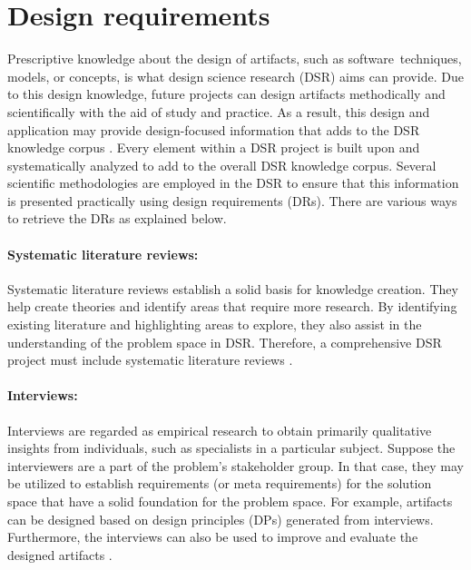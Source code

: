 \section{Design requirements}
\label{background:section:designReqs}
Prescriptive knowledge about the design of artifacts, such as software techniques, models, or concepts, is what design science research (DSR) aims can provide. 
Due to this design knowledge, future projects can design artifacts methodically and scientifically with the aid of study and practice. 
As a result, this design and application may provide design-focused information that adds to the DSR knowledge corpus \cite{misc:dsr:henver}.
Every element within a DSR project is built upon and systematically analyzed to add to the overall DSR knowledge corpus.
Several scientific methodologies are employed in the DSR to ensure that this information is presented practically using design requirements (DRs).
There are various ways to retrieve the DRs as explained below.

\paragraph*{Systematic literature reviews:} 
Systematic literature reviews establish a solid basis for knowledge creation. 
They help create theories and identify areas that require more research.
By identifying existing literature and highlighting areas to explore, they also assist in the understanding of the problem space in DSR.
Therefore, a comprehensive DSR project must include systematic literature reviews \cite{misc:dsr:webster}.

\paragraph*{Interviews:}
Interviews are regarded as empirical research to obtain primarily qualitative insights from individuals, such as specialists in a particular subject. 
Suppose the interviewers are a part of the problem's stakeholder group.
In that case, they may be utilized to establish requirements (or meta requirements) for the solution space that have a solid foundation for the problem space.
For example, artifacts can be designed based on design principles (DPs) generated from interviews.
Furthermore, the interviews can also be used to improve and evaluate the designed artifacts \cite{misc:dsr:mayring}. 

